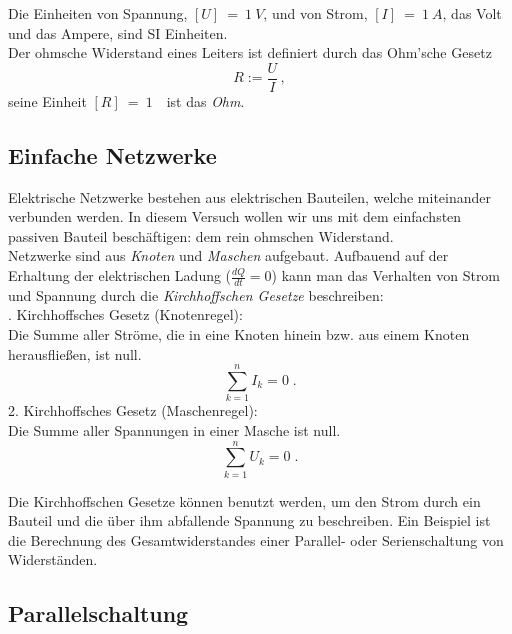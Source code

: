 \noindent
Die Einheiten von Spannung, $[U]~=~1~V$, und von Strom, $[I]~=~1~A$, das Volt und das Ampere, sind SI Einheiten. \\

\noindent
Der ohmsche Widerstand eines Leiters ist definiert durch das Ohm'sche Gesetz
\begin{equation} \label{eq:Ohm}
R:=\frac{U}{I}\, ,
\end{equation}
seine Einheit $[R]~=~1$~\Ohm\, ist das \textit{Ohm}.

\subsection{Einfache Netzwerke}

Elektrische Netzwerke bestehen aus elektrischen Bauteilen, welche miteinander verbunden werden. In diesem Versuch wollen wir uns mit dem einfachsten passiven Bauteil beschäftigen: dem rein ohmschen Widerstand.\\
Netzwerke sind aus \textit{Knoten} und \textit{Maschen} aufgebaut. Aufbauend auf der Erhaltung der elektrischen Ladung ($\frac{dQ}{dt} = 0$) kann man das Verhalten von Strom und Spannung durch die \textit{Kirchhoffschen Gesetze} beschreiben:\\

. Kirchhoffsches Gesetz (Knotenregel): \\
	Die Summe aller Ströme, die in eine Knoten hinein bzw. aus einem Knoten herausfließen, ist null.
 \begin{equation}
  \sum^n_{k=1}{I_k} = 0 \; .
  \label{eq:Kirchhoff1}
 \end{equation}
%
2. Kirchhoffsches Gesetz (Maschenregel): \\
	Die Summe aller Spannungen in einer Masche ist null.
\begin{equation}
 \sum^n_{k=1}{U_k} = 0 \; .
 \label{eq:Kirchoff2}
\end{equation}

\noindent
Die Kirchhoffschen Gesetze können benutzt werden, um den Strom durch ein Bauteil und die über ihm abfallende Spannung zu beschreiben. Ein Beispiel ist die Berechnung des Gesamtwiderstandes einer Parallel- oder Serienschaltung von Widerständen.
%
\subsection{Parallelschaltung}

